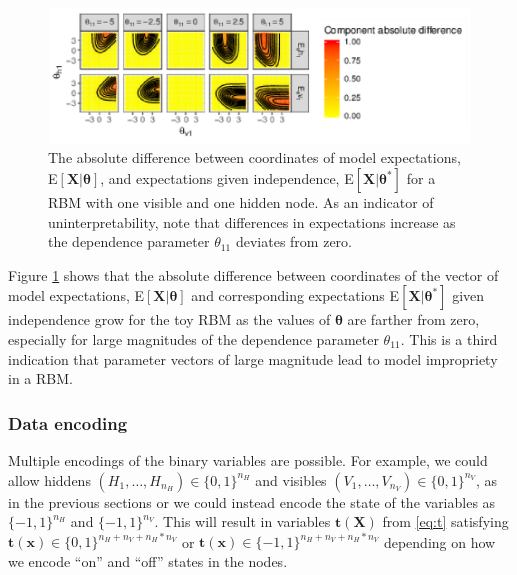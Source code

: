 \documentclass[]{article}
\theoremstyle{definition}
\newcommand{\nv}{{n_{\scriptscriptstyle V}}}
\newcommand{\nh}{{n_{\scriptscriptstyle H}}}
\begin{document}
\par
\begin{figure}

{\centering \includegraphics{paper_files/figure-latex/uninterp-1} 

}

\caption{The absolute difference between coordinates of model expectations, E$\left[\boldsymbol X | \boldsymbol \theta\right]$, and expectations given independence, E$\left[\boldsymbol X | \boldsymbol \theta^* \right ]$ for a RBM with one visible and one hidden node. As an indicator of uninterpretability, note that differences in expectations increase as the dependence parameter $\theta_{11}$ deviates from zero.}\label{fig:uninterp}
\end{figure}
Figure \ref{fig:uninterp} shows that the absolute difference between
coordinates of the vector of model expectations,
E\(\left[\boldsymbol X | \boldsymbol \theta\right]\) and corresponding
expectations E\(\left[\boldsymbol X | \boldsymbol \theta^*\right ]\)
given independence grow for the toy RBM as the values of
\(\boldsymbol \theta\) are farther from zero, especially for large
magnitudes of the dependence parameter \(\theta_{11}\). This is a third
indication that parameter vectors of large magnitude lead to model
impropriety in a RBM.

\hypertarget{data-encoding}{%
\subsubsection{Data encoding}\label{data-encoding}}

Multiple encodings of the binary variables are possible. For example, we
could allow hiddens \((H_1, \dots, H_\nh) \in \{0,1\}^\nh\) and visibles
\((V_1, \dots, V_\nv) \in \{0,1\}^\nv\), as in the previous sections or
we could instead encode the state of the variables as \(\{-1,1\}^\nh\)
and \(\{-1,1\}^\nv\). This will result in variables
\(\boldsymbol t(\boldsymbol X)\) from \eqref{eq:t} satisfying
\(\boldsymbol t(\boldsymbol x) \in \{0,1\}^{\nh + \nv + \nh*\nv}\) or
\(\boldsymbol t(\boldsymbol x) \in \{-1,1\}^{\nh + \nv + \nh*\nv}\)
depending on how we encode ``on'' and ``off'' states in the nodes.
\end{document}
